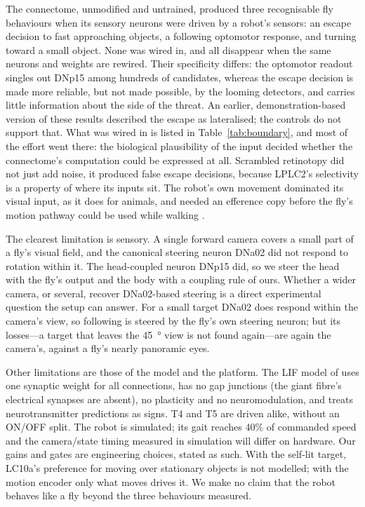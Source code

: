 \documentclass[10pt,a4paper]{article}
\begin{document}
The connectome, unmodified and untrained, produced three recognisable fly behaviours when its sensory
neurons were driven by a robot's sensors: an escape decision to fast approaching objects, a following
optomotor response, and turning toward a small object. None was wired in, and all disappear when the same
neurons and weights are rewired. Their specificity differs: the optomotor readout singles out DNp15 among hundreds of candidates,
whereas the escape decision is made more reliable, but not made possible, by the looming detectors, and
carries little information about the side of the threat. An earlier, demonstration-based version of these
results described the escape as lateralised; the controls do not support that. What was wired in is listed in
Table~\ref{tab:boundary}, and most of the effort went there: the biological plausibility of the input
decided whether the connectome's computation could be expressed at all. Scrambled retinotopy did not just
add noise, it produced false escape decisions, because LPLC2's selectivity is a property of where its
inputs sit. The robot's own movement dominated its visual input, as it does for animals, and needed an
efference copy before the fly's motion pathway could be used while walking \cite{kim2015}.

The clearest limitation is sensory. A single forward camera covers a small part of a fly's visual field,
and the canonical steering neuron DNa02 \cite{rayshubskiy2020} did not respond to rotation within it. The
head-coupled neuron DNp15 did, so we steer the head with the fly's output and the body with a coupling rule
of ours. Whether a wider camera, or several, recover DNa02-based steering is a direct experimental question
the setup can answer. For a small target DNa02 does respond within the camera's view, so following is
steered by the fly's own steering neuron; but its losses---a target that leaves the \SI{45}{\degree} view
is not found again---are again the camera's, against a fly's nearly panoramic eyes.

Other limitations are those of the model and the platform. The LIF model of \cite{shiu2024} uses one
synaptic weight for all connections, has no gap junctions (the giant fibre's electrical synapses are
absent), no plasticity and no neuromodulation, and treats neurotransmitter predictions as signs. T4 and T5
are driven alike, without an ON/OFF split. The robot is simulated; its gait reaches 40\% of commanded speed
and the camera/state timing measured in simulation will differ on hardware. Our gains and gates are
engineering choices, stated as such. With the self-lit target, LC10a's preference for moving over
stationary objects is not modelled; with the motion encoder only what moves drives it.
We make no claim that the robot behaves like a fly beyond the three behaviours measured.
\end{document}
